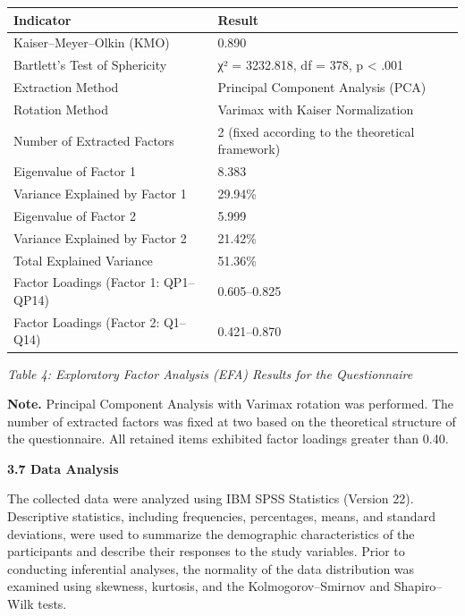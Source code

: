 \documentclass[11pt,a4paper]{article}
\begin{document}
	\begin{table}[h]
		\centering
		\begin{tabular}{|l|l|}
			\hline
			Indicator & Result \\ \hline
			Kaiser--Meyer--Olkin (KMO) & 0.890 \\ \hline
			Bartlett's Test of Sphericity & χ² = 3232.818, df = 378, p \textless{} .001 \\ \hline
			Extraction Method & Principal Component Analysis (PCA) \\ \hline
			Rotation Method & Varimax with Kaiser Normalization \\ \hline
			Number of Extracted Factors & 2 (fixed according to the theoretical framework) \\ \hline
			Eigenvalue of Factor 1 & 8.383 \\ \hline
			Variance Explained by Factor 1 & 29.94\% \\ \hline
			Eigenvalue of Factor 2 & 5.999 \\ \hline
			Variance Explained by Factor 2 & 21.42\% \\ \hline
			Total Explained Variance & 51.36\% \\ \hline
			Factor Loadings (Factor 1: QP1--QP14) & 0.605--0.825 \\ \hline
			Factor Loadings (Factor 2: Q1--Q14) & 0.421--0.870 \\ \hline
		\end{tabular}
	\end{table}
	
	\textit{Table 4: Exploratory Factor Analysis (EFA) Results for the Questionnaire}
	
	\textbf{Note.} Principal Component Analysis with Varimax rotation was performed. The number of extracted factors was fixed at two based on the theoretical structure of the questionnaire. All retained items exhibited factor loadings greater than 0.40.
	
	\textbf{3.7 Data Analysis}
	
	The collected data were analyzed using IBM SPSS Statistics (Version 22). Descriptive statistics, including frequencies, percentages, means, and standard deviations, were used to summarize the demographic characteristics of the participants and describe their responses to the study variables. Prior to conducting inferential analyses, the normality of the data distribution was examined using skewness, kurtosis, and the Kolmogorov--Smirnov and Shapiro--Wilk tests.
	
\end{document}

